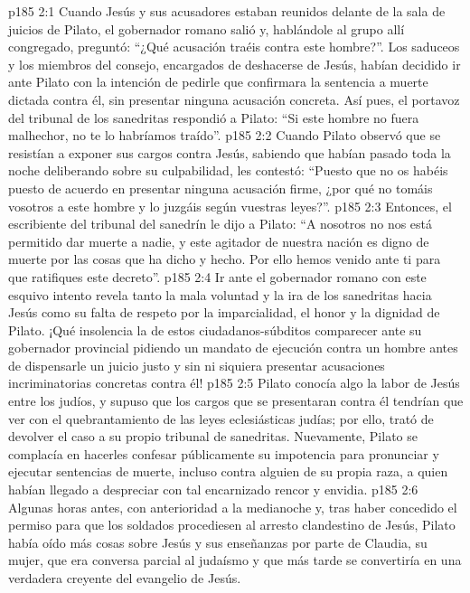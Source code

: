 \vs p185 2:1 Cuando Jesús y sus acusadores estaban reunidos delante de la sala de juicios de Pilato, el gobernador romano salió y, hablándole al grupo allí congregado, preguntó: “¿Qué acusación traéis contra este hombre?”. Los saduceos y los miembros del consejo, encargados de deshacerse de Jesús, habían decidido ir ante Pilato con la intención de pedirle que confirmara la sentencia a muerte dictada contra él, sin presentar ninguna acusación concreta. Así pues, el portavoz del tribunal de los sanedritas respondió a Pilato: “Si este hombre no fuera malhechor, no te lo habríamos traído”.
\vs p185 2:2 Cuando Pilato observó que se resistían a exponer sus cargos contra Jesús, sabiendo que habían pasado toda la noche deliberando sobre su culpabilidad, les contestó: “Puesto que no os habéis puesto de acuerdo en presentar ninguna acusación firme, ¿por qué no tomáis vosotros a este hombre y lo juzgáis según vuestras leyes?”.
\vs p185 2:3 Entonces, el escribiente del tribunal del sanedrín le dijo a Pilato: “A nosotros no nos está permitido dar muerte a nadie, y este agitador de nuestra nación es digno de muerte por las cosas que ha dicho y hecho. Por ello hemos venido ante ti para que ratifiques este decreto”.
\vs p185 2:4 Ir ante el gobernador romano con este esquivo intento revela tanto la mala voluntad y la ira de los sanedritas hacia Jesús como su falta de respeto por la imparcialidad, el honor y la dignidad de Pilato. ¡Qué insolencia la de estos ciudadanos\hyp{}súbditos comparecer ante su gobernador provincial pidiendo un mandato de ejecución contra un hombre antes de dispensarle un juicio justo y sin ni siquiera presentar acusaciones incriminatorias concretas contra él!
\vs p185 2:5 Pilato conocía algo la labor de Jesús entre los judíos, y supuso que los cargos que se presentaran contra él tendrían que ver con el quebrantamiento de las leyes eclesiásticas judías; por ello, trató de devolver el caso a su propio tribunal de sanedritas. Nuevamente, Pilato se complacía en hacerles confesar públicamente su impotencia para pronunciar y ejecutar sentencias de muerte, incluso contra alguien de su propia raza, a quien habían llegado a despreciar con tal encarnizado rencor y envidia.
\vs p185 2:6 \pc Algunas horas antes, con anterioridad a la medianoche y, tras haber concedido el permiso para que los soldados procediesen al arresto clandestino de Jesús, Pilato había oído más cosas sobre Jesús y sus enseñanzas por parte de Claudia, su mujer, que era conversa parcial al judaísmo y que más tarde se convertiría en una verdadera creyente del evangelio de Jesús.
